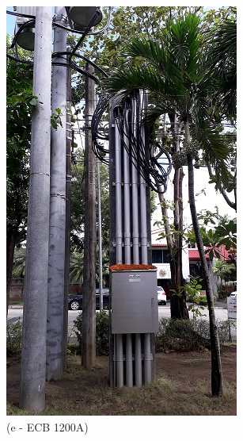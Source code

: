 \begin{figure}
\begin{minipage}[b]{0.22\linewidth}
		\includegraphics[width=\textwidth]{figures/R1P_visual/ECB1200A}
		\caption*{(e - ECB 1200A)}
	\end{minipage}
	\hspace{0.03cm}
	\begin{minipage}[b]{0.22\linewidth}

\end{minipage}
\end{figure}

